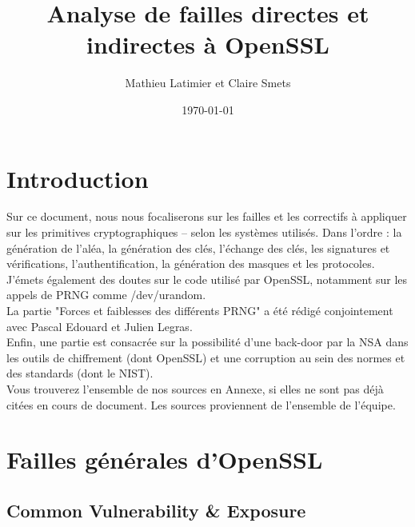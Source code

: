 \documentclass{article}
\title{\vfill \textbf{Analyse de failles directes et indirectes à OpenSSL}}
\author{Mathieu Latimier et Claire Smets}
\date{\today \vfill}
\begin{document}
\maketitle




\newpage




\tableofcontents




\newpage




\section{Introduction}

	Sur ce document, nous nous focaliserons sur les failles et les correctifs 
	à appliquer sur les primitives cryptographiques – selon les systèmes
	utilisés.
	Dans l'ordre : la génération de l'aléa, la génération des clés, 
	l'échange des clés, les signatures et vérifications, l'authentification, la génération des masques et les protocoles.
	J’émets également des doutes sur le code utilisé par OpenSSL, notamment sur les 
	appels de PRNG comme /dev/urandom.\\
	
	La partie "Forces et faiblesses des différents PRNG" a été rédigé
	conjointement avec Pascal Edouard et Julien Legras.\\
	
	Enfin, une partie est consacrée sur la possibilité d'une back-door par 
	la NSA dans les outils de chiffrement (dont OpenSSL) et une corruption au 
	sein des normes et des standards (dont le NIST).\\
	
	Vous trouverez l'ensemble de nos sources en Annexe, si elles ne sont pas 
	déjà citées en cours de document. Les sources proviennent de l'ensemble de
	l'équipe.

	\newpage











\section{Failles générales d'OpenSSL}


	\subsection{Common Vulnerability \& Exposure}
	
\end{document}

